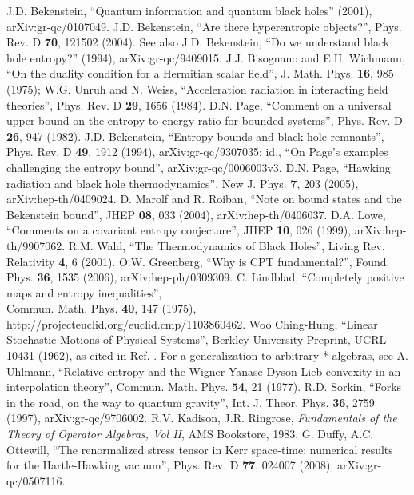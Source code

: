 \documentclass{article}
\begin{document}
\begin{thebibliography}{99}
J.D. Bekenstein, ``Quantum information and quantum black holes'' (2001), arXiv:gr-qc/0107049.
J.D. Bekenstein, ``Are there hyperentropic objects?'', Phys. Rev. D \textbf{70}, 121502 (2004).  See also J.D. Bekenstein, ``Do we understand black hole entropy?'' (1994), arXiv:gr-qc/9409015.
J.J. Bisognano and E.H. Wichmann, ``On the duality condition for a Hermitian scalar field'', J. Math. Phys. \textbf{16}, 985 (1975); W.G. Unruh and N. Weiss, ``Acceleration radiation in interacting field theories'', Phys. Rev. D \textbf{29}, 1656 (1984).
D.N. Page, ``Comment on a universal upper bound on the entropy-to-energy ratio for bounded systems'', Phys. Rev. D \textbf{26}, 947 (1982).
J.D. Bekenstein, ``Entropy bounds and black hole remnants'', Phys. Rev. D \textbf{49}, 1912 (1994), arXiv:gr-qc/9307035; id., ``On Page's examples challenging the entropy bound'', arXiv:gr-qc/0006003v3.
D.N. Page, ``Hawking radiation and black hole thermodynamics'', New J. Phys. \textbf{7}, 203 (2005), arXiv:hep-th/0409024.
D. Marolf and R. Roiban, ``Note on bound states and the Bekenstein bound'', JHEP \textbf{08}, 033 (2004), arXiv:hep-th/0406037.
D.A. Lowe, ``Comments on a covariant entropy conjecture'', JHEP \textbf{10}, 026 (1999), arXiv:hep-th/9907062.
R.M. Wald, ``The Thermodynamics of Black Holes'', Living Rev. Relativity \textbf{4}, 6 (2001).
O.W. Greenberg, ``Why is CPT fundamental?'', Found. Phys. \textbf{36}, 1535 (2006), arXiv:hep-ph/0309309.
C. Lindblad, ``Completely positive maps and entropy inequalities'', \\Commun. Math. Phys. \textbf{40}, 147 (1975), \\http://projecteuclid.org/euclid.cmp/1103860462.  Woo Ching-Hung, ``Linear Stochastic Motions of Physical Systems'', Berkley University Preprint, UCRL-10431 (1962), as cited in Ref. \cite{sorkin98}.  For a generalization to arbitrary *-algebras, see A. Uhlmann, ``Relative entropy and the Wigner-Yanase-Dyson-Lieb convexity in an interpolation theory'', Commun. Math. Phys. \textbf{54}, 21 (1977).
R.D. Sorkin, ``Forks in the road, on the way to quantum gravity'', Int. J. Theor. Phys. \textbf{36}, 2759 (1997), arXiv:gr-qc/9706002.
R.V. Kadison, J.R. Ringrose, \textit{Fundamentals of the Theory of Operator Algebras, Vol II}, AMS Bookstore, 1983.
G. Duffy, A.C. Ottewill, ``The renormalized stress tensor in Kerr space-time: numerical results for the Hartle-Hawking vacuum'', Phys. Rev. D \textbf{77}, 024007 (2008), arXiv:gr-qc/0507116.

\end{thebibliography}
\end{document}
